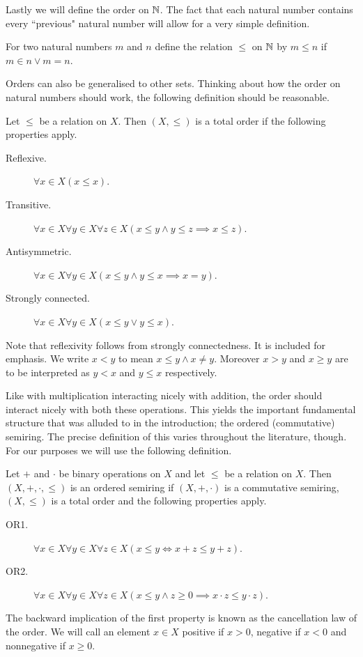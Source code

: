 \documentclass[../main.tex]{subfiles}
\begin{document}
Lastly we will define the order on $\mathbb{N}$. The fact that each natural number contains every ``previous" natural number will allow for a very simple definition.
\begin{definition}\label{dfn:the_natural_numbers_integers_and_rational_numbers:N_order}
    For two natural numbers $m$ and $n$ define the relation $\leq$ on $\mathbb{N}$ by $m\leq n$ if $m\in n\lor m=n$.
\end{definition}
Orders can also be generalised to other sets. Thinking about how the order on natural numbers should work, the following definition should be reasonable.
\begin{definition}
    Let $\leq$ be a relation on $X$. Then $(X,\leq)$ is a total order if the following properties apply.
    \begin{description}
        \item[Reflexive.] $\forall x\in X(x\leq x)$.
        \item[Transitive.] $\forall x\in X\forall y\in X\forall z\in X(x\leq y\land y\leq z\implies x\leq z)$.
        \item[Antisymmetric.] $\forall x\in X\forall y\in X(x\leq y\land y\leq x\implies x=y)$.
        \item[Strongly connected.] $\forall x\in X\forall y\in X(x\leq y\lor y\leq x)$.
    \end{description}
    Note that reflexivity follows from strongly connectedness. It is included for emphasis. We write $x<y$ to mean $x\leq y\land x\neq y$. Moreover $x>y$ and $x\geq y$ are to be interpreted as $y<x$ and $y\leq x$ respectively.
\end{definition}
Like with multiplication interacting nicely with addition, the order should interact nicely with both these operations. This yields the important fundamental structure that was alluded to in the introduction; the ordered (commutative) semiring. The precise definition of this varies throughout the literature, though. For our purposes we will use the following definition.
\begin{definition}
    Let $+$ and $\cdot$ be binary operations on $X$ and let $\leq$ be a relation on $X$. Then $(X,+,\cdot,\leq)$ is an ordered semiring if $(X,+,\cdot)$ is a commutative semiring, $(X,\leq)$ is a total order and the following properties apply.
    \begin{description}
        \item[OR1.] $\forall x\in X\forall y\in X\forall z\in X(x\leq y\iff x+z\leq y+z)$.
        \item[OR2.] $\forall x\in X\forall y\in X\forall z\in X(x\leq y\land z\geq0\implies x\cdot z\leq y\cdot z)$.
    \end{description}
    The backward implication of the first property is known as the cancellation law of the order. We will call an element $x\in X$ positive if $x>0$, negative if $x<0$ and nonnegative if $x\geq0$.
\end{definition}
\end{document}
